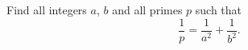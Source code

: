 Find all integers $a$, $b$ and all primes $p$ such that
\[
\dfrac{1}{p}=\dfrac{1}{a^2}+\dfrac{1}{b^2}.
\]
